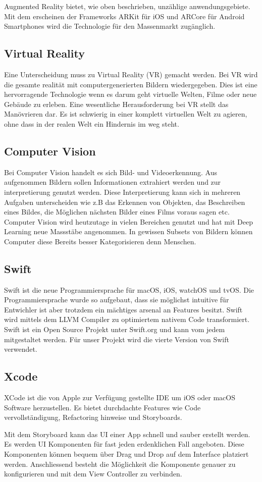 Augmented Reality bietet, wie oben beschrieben, unzählige anwendungsgebiete. Mit dem erscheinen der Frameworks ARKit für iOS und ARCore für Android Smartphones wird die Technologie für den Massenmarkt zugänglich.

\subsection{Virtual Reality} \label{sub:virtual-reality}
Eine Unterscheidung muss zu Virtual Reality (VR) gemacht werden. Bei VR wird die gesamte realität mit computergenerierten Bildern wiedergegeben. Dies ist eine hervorragende Technologie wenn es darum geht virtuelle Welten, Filme oder neue Gebäude zu erleben. Eine wesentliche Herausforderung bei VR stellt das Manövrieren dar. Es ist schwierig in einer komplett virtuellen Welt zu agieren, ohne dass in der realen Welt ein Hindernis im weg steht.

\subsection{Computer Vision} \label{sub:computer-vision}
Bei Computer Vision handelt es sich Bild- und Videoerkennung. Aus aufgenommen Bildern sollen Informationen extrahiert werden und zur interpretierung genutzt werden. Diese Interpretierung kann sich in mehreren Aufgaben unterscheiden wie z.B das Erkennen von Objekten, das Beschreiben eines Bildes, die Möglichen nächsten Bilder eines Films voraus sagen etc. Computer Vision wird heutzutage in vielen Bereichen genutzt und hat mit Deep Learning neue Massstäbe angenommen. In gewissen Subsets von Bildern können Computer diese Bereits besser Kategorisieren denn Menschen.

\subsection{Swift}
Swift ist die neue Programmiersprache für macOS, iOS, watchOS und tvOS. Die Programmiersprache wurde so aufgebaut, dass sie möglichst intuitive für Entwichler ist aber trotzdem ein mächtiges arsenal an Features besitzt. Swift wird mittels dem LLVM Compiler zu optimiertem nativem Code transformiert. Swift ist ein Open Source Projekt unter Swift.org und kann vom jedem mitgestaltet werden. Für unser Projekt wird die vierte Version von Swift verwendet.


\subsection{Xcode}
XCode ist die von Apple zur Verfügung gestellte IDE um iOS oder macOS Software herzustellen. Es bietet durchdachte Features wie Code vervollständigung, Refactoring hinweise und Storyboards.

Mit dem Storyboard kann das UI einer App schnell und sauber erstellt werden. Es werden UI Komponenten für fast jeden erdenklichen Fall angeboten. Diese Komponenten können bequem über Drag und Drop auf dem Interface platziert werden. Anschliessend besteht die Möglichkeit die Komponente genauer zu konfigurieren und mit dem View Controller zu verbinden.
